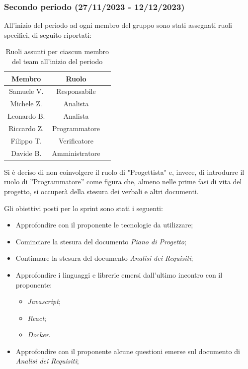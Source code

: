 \subsubsection{Secondo periodo (27/11/2023 - 12/12/2023)}

All'inizio del periodo ad ogni membro del gruppo sono stati assegnati ruoli specifici, di seguito riportati:
\begin{table}[H]
\centering
\begin{tabular}{|c|c|c|}
\hline
\textbf{Membro} & \textbf{Ruolo} \\
\hline
Samuele V. & Responsabile \\
\hline
Michele Z. & Analista \\
\hline
Leonardo B. & Analista \\
\hline
Riccardo Z. & Programmatore \\
\hline
Filippo T. & Verificatore \\
\hline
Davide B. & Amministratore \\
\hline
\end{tabular}
\caption{Ruoli assunti per ciascun membro del team all'inizio del periodo}
\end{table}
Si è deciso di non coinvolgere il ruolo di "Progettista"  e, invece, di introdurre il ruolo di ”Programmatore” come figura che, almeno nelle prime fasi di vita del progetto, si occuperà della stesura dei verbali e altri documenti.

Gli obiettivi posti per lo sprint sono stati i seguenti:
\begin{itemize}
    \item Approfondire con il proponente le tecnologie da utilizzare;
    \item Cominciare la stesura del documento \emph{Piano di Progetto};
    \item Continuare la stesura del documento \emph{Analisi dei Requisiti};
    \item Approfondire i linguaggi e librerie emersi dall'ultimo incontro con il proponente:
    \begin{itemize}
        \item \emph{Javascript};
        \item \emph{React};
        \item \emph{Docker}.
    \end{itemize}
    \item Approfondire con il proponente alcune questioni emerse sul documento di \emph{Analisi dei Requisiti};
\end{itemize}

